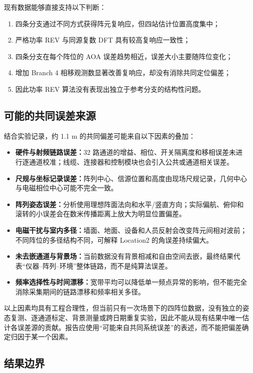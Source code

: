 \documentclass[UTF8,12pt,a4paper]{ctexart}
\begin{document}
现有数据能够直接支持以下判断：

\begin{enumerate}
  \item 四条分支通过不同方式获得阵元复响应，但四站估计位置高度集中；
  \item 严格功率 REV 与同源复数 DFT 具有较高复响应一致性；
  \item 四条分支在每个阵位的 AOA 误差趋势相近，误差大小主要随阵位变化；
  \item 增加 Branch 4 相移观测数显著改善复响应，却没有消除共同定位偏差；
  \item 因此功率 REV 算法没有表现出独立于参考分支的结构性问题。
\end{enumerate}

\subsection{可能的共同误差来源}

结合实验记录，约 1.1 m 的共同偏差可能来自以下因素的叠加：

\begin{itemize}
  \item \textbf{硬件与射频链路误差：}32 路通道的增益、相位、开关隔离度和移相误差未进行逐通道校准；线缆、连接器和控制模块也会引入公共或通道相关误差。
  \item \textbf{尺规与坐标记录误差：}阵列中心、信源位置和高度由现场尺规记录，几何中心与电磁相位中心可能不完全一致。
  \item \textbf{阵列姿态误差：}分析使用理想阵面法向和水平/竖直方向；实际偏航、俯仰和滚转的小误差会在数米传播距离上放大为明显位置偏差。
  \item \textbf{电磁干扰与室内多径：}墙面、地面、设备和人员反射会改变阵元间相对波前；不同阵位的多径结构不同，可解释 Location2 的角误差持续偏大。
  \item \textbf{未去嵌通道与背景场：}当前数据没有背景相减和自由空间去嵌，最终结果代表“仪器--阵列--环境”整体链路，而不是纯算法误差。
  \item \textbf{频率选择性与时间漂移：}宽带平均可以降低单一频点异常的影响，但不能完全消除采集期间的链路漂移和频率相关多径。
\end{itemize}

以上因素均具有工程合理性，但当前只有一次场景下的四阵位数据，没有独立的姿态复测、逐通道标定、背景测量或跨日期重复实验，因此不能从现有结果中唯一估计各误差源的贡献。报告应使用“可能来自共同系统误差”的表述，而不能把偏差确定归因于某一个因素。

\subsection{结果边界}
\end{document}
